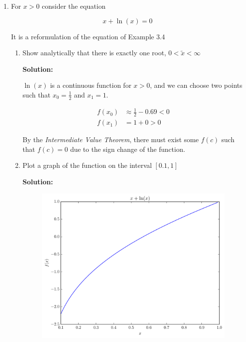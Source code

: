 \documentclass[12pt]{article}
\begin{document}
\begin{enumerate}
\begin{enumerate}
{\bf Solution:}

Newton's method only has two evaluations of the exponential function $\left(f(x)\right.$ and $\left.\frac{\text{d}}{\text{d}x}f(x) \right)$
while the Secant Method has three. Thus, Newton's Method should perform better.

This can be reduced down to a single exponential evaluation for the Secant Method
by, instead of taking the na\"{i}ve approach you store the last value and only
calculate $e^{x_{k}}$ once instead. In that instance, the Secant Method would win
out as it only has to do one function evaluation, but Newton's Method is stuck at 2.

However, in overall time, Newton's Method will most likely win out since it is
quadratically convergent in this case.


\end{enumerate}

\item For $x>0$ consider the equation

\[
x + \ln(x) = 0
\]

It is a reformulation of the equation of Example 3.4

\begin{enumerate}
  \item Show analytically that there is exactly one root, $0 < \widetilde{x} < \infty$

  {\bf Solution:}

  $\ln(x)$ is a continuous function for $x > 0$, and we can choose two points such that
  $x_{0} = \frac{1}{2}$ and $x_{1} = 1$.

  \begin{align*}
    f\left( x_{0}\right) &\approx \frac{1}{2} - 0.69 < 0\\
    f\left( x_{1}\right) &= 1 + 0 > 0
  \end{align*}

  By the {\em Intermediate Value Theorem}, there must exist some $f(c)$ such that
  $f(c) = 0$ due to the sign change of the function.

  \item Plot a graph of the function on the interval $[0.1, 1]$

  {\bf Solution:}

  \begin{figure}
    \centering
    \includegraphics[width=.65\textwidth]{hw2_prob6a.pdf}
  \end{figure}


\end{enumerate}
\end{enumerate}
\end{document}
